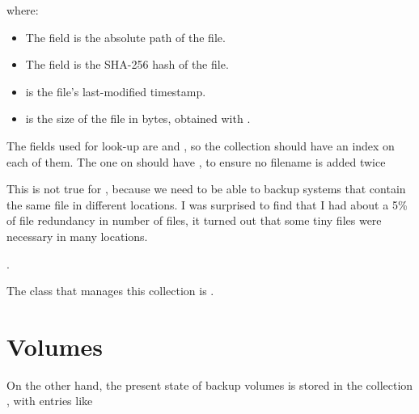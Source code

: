 \documentclass[letterpaper,10pt,english]{sphinxmanual}
\begin{document}
where:
\begin{itemize}
\item {} 
The  field is the absolute path of the file.

\item {} 
The  field is the SHA-256 hash of the file.

\item {} 
 is the file's last-modified timestamp.

\item {} 
 is the size of the file in bytes, obtained with .

\end{itemize}

The fields used for look-up are  and , so the collection should have an index on each of them.
The one on  should have , to ensure no filename is added twice %
\begin{footnote}[2]\sphinxAtStartFootnote
This is not true for , because we need to be able to backup systems that contain the same file in different locations.
I was surprised to find that I had about a 5\% of file redundancy in number of files, it turned out that some tiny files were necessary in many locations.
%
\end{footnote} .

The class that manages this collection is {\hyperref[\detokenize{index:fsbackup.fileDB.FileDB}]{}}.


\section{Volumes}
\label{\detokenize{index:volumes}}
On the other hand, the present state of backup volumes is stored in the collection ,
with entries like

\begin{sphinxVerbatim}[commandchars=\\\{\}]
 
 
 
 
\end{sphinxVerbatim}
\end{document}
